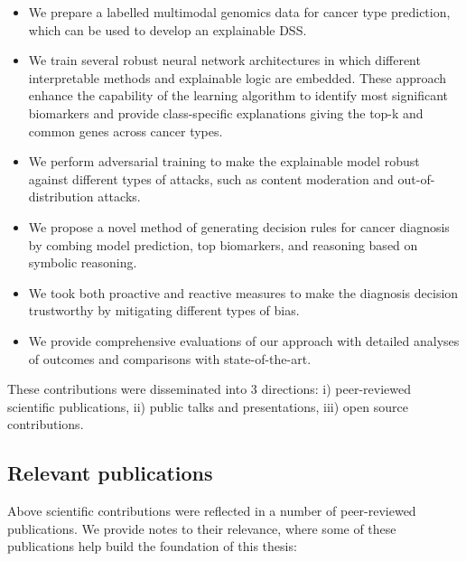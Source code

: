 \begin{itemize}[noitemsep]
    \item We prepare a labelled multimodal genomics data for cancer type prediction, which can be used to develop an explainable DSS.  
    \item We train several robust neural network architectures in which different interpretable methods and explainable logic are embedded. These approach enhance the capability of the learning algorithm to identify most significant biomarkers and provide class-specific explanations giving the top-k and common genes across cancer types. 
    \item We perform adversarial training to make the explainable model robust against different types of attacks, such as content moderation and out-of-distribution attacks. 
    \item We propose a novel method of generating decision rules for cancer diagnosis by combing model prediction, top biomarkers, and reasoning based on symbolic reasoning. 
    \item We took both proactive and reactive measures to make the diagnosis decision trustworthy by mitigating different types of bias. 
    \item We provide comprehensive evaluations of our approach with detailed analyses of outcomes and comparisons with state-of-the-art. 
\end{itemize}

\hspace*{3.5mm} These contributions were disseminated into 3 directions: i) peer-reviewed scientific publications, ii) public talks and presentations, iii) open source contributions. %

\subsection{Relevant publications}
Above scientific contributions were reflected in a number of peer-reviewed publications. We provide notes to their relevance, where some of these publications help build the foundation of this thesis: 

